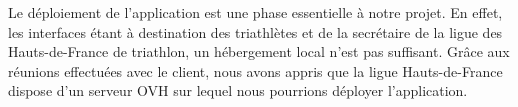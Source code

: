 Le déploiement de l'application est une phase essentielle à notre projet. En effet, les interfaces étant à destination des triathlètes et de la secrétaire de la ligue des Hauts-de-France de triathlon, un hébergement local n'est pas suffisant.\newline
Grâce aux réunions effectuées avec le client, nous avons appris que la ligue Hauts-de-France dispose d'un serveur OVH sur lequel nous pourrions déployer l'application. 
